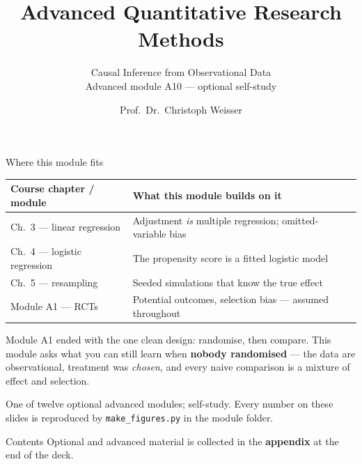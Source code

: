 \documentclass[aspectratio=169,11pt]{beamer}
\title{Advanced Quantitative Research Methods}
\subtitle{Causal Inference from Observational Data\\[2pt]{\small Advanced module A10 --- optional self-study}}
\author{Prof.\ Dr.\ Christoph Weisser}
\date{}\graphicspath{{images/}}
\begin{document}
\begin{frame}[plain]\titlepage\end{frame}

\begin{frame}{Where this module fits}
  \footnotesize
  \begin{center}
  \begin{tabular}{@{}p{3.9cm}p{8.4cm}@{}}
    \toprule
    \textbf{Course chapter / module} & \textbf{What this module builds on it} \\
    \midrule
    Ch.\ 3 --- linear regression & Adjustment \emph{is} multiple regression; omitted-variable bias \\
    Ch.\ 4 --- logistic regression & The propensity score is a fitted logistic model \\
    Ch.\ 5 --- resampling & Seeded simulations that know the true effect \\
    Module A1 --- RCTs & Potential outcomes, selection bias --- assumed throughout \\
    \bottomrule
  \end{tabular}
  \end{center}
  \vspace{2pt}
  \begin{takeaway}
    Module A1 ended with the one clean design: randomise, then compare. This module
    asks what you can still learn when \textbf{nobody randomised} --- the data are
    observational, treatment was \emph{chosen}, and every naive comparison is a
    mixture of effect and selection.
  \end{takeaway}
  {\scriptsize One of twelve optional advanced modules; self-study. Every number on
  these slides is reproduced by \texttt{make\_figures.py} in the module folder.}
\end{frame}

\begin{frame}{Contents}\small\tableofcontents[hideallsubsections]
  \vfill
  {\tiny Optional and advanced material is collected in the \textbf{appendix} at the end of the deck.}
\end{frame}
\end{document}
